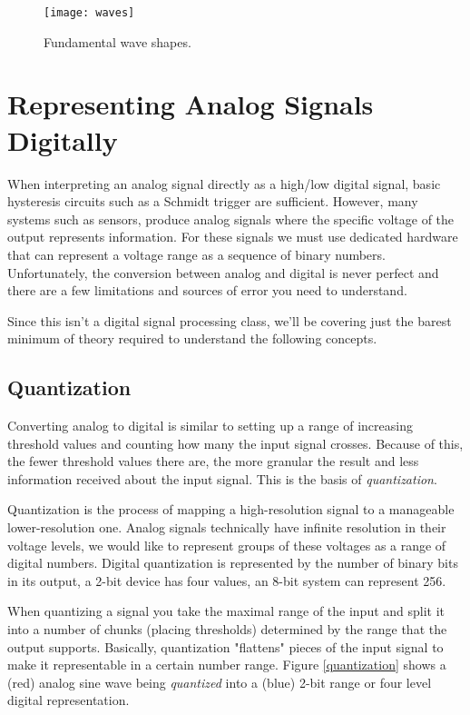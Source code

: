 \documentclass[openany,11pt,fleqn]{book} %
\begin{document}
\begin{figure}[]
    \centering\texttt{[image: waves]}
    \caption{Fundamental wave shapes.}
    \label{waves}
\end{figure}


\section{\color{orange}Representing Analog Signals Digitally}
When interpreting an analog signal directly as a high/low digital signal, basic hysteresis circuits such as a Schmidt trigger are sufficient. However, many systems such as sensors, produce analog signals where the specific voltage of the output represents information. For these signals we must use dedicated hardware that can represent a voltage range as a sequence of binary numbers. Unfortunately, the conversion between analog and digital is never perfect and there are a few limitations and sources of error you need to understand. 

Since this isn't a digital signal processing class, we'll be covering just the barest minimum of theory required to understand the following concepts.

\subsection{\color{orange}Quantization}
Converting analog to digital is similar to setting up a range of increasing threshold values and counting how many the input signal crosses. Because of this, the fewer threshold values there are, the more granular the result and less information received about the input signal. This is the basis of \textit{quantization}.

Quantization is the process of mapping a high-resolution signal to a manageable lower-resolution one. Analog signals technically have infinite resolution in their voltage levels, we would like to represent groups of these voltages as a range of digital numbers. Digital quantization is represented by the number of binary bits in its output, a 2-bit device has four values, an 8-bit system can represent 256. 

When quantizing a signal you take the maximal range of the input and split it into a number of chunks (placing thresholds) determined by the range that the output supports. Basically, quantization "flattens" pieces of the input signal to make it representable in a certain number range. Figure \ref{quantization} shows a (red) analog sine wave being \textit{quantized} into a (blue) 2-bit range or four level digital representation.  
\end{document}
